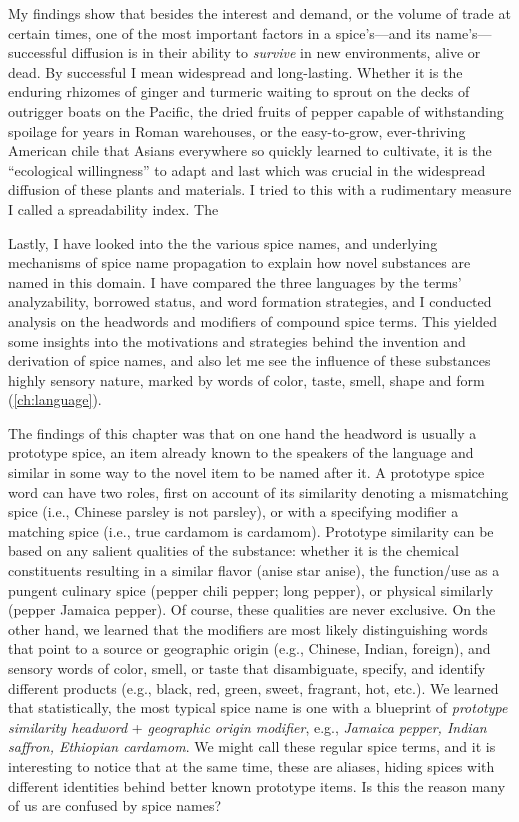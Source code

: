 My findings show that besides the interest and demand, or the volume of trade at certain times, one of the most important factors in a spice's---and its name's---successful diffusion is in their ability to \textit{survive} in new environments, alive or dead. By successful I mean widespread and long-lasting. Whether it is the enduring rhizomes of ginger and turmeric waiting to sprout on the decks of outrigger boats on the Pacific, the dried fruits of pepper capable of withstanding spoilage for years in Roman warehouses, or the easy-to-grow, ever-thriving American chile that Asians everywhere so quickly learned to cultivate, it is the ``ecological willingness'' to adapt and last which was crucial in the widespread diffusion of these plants and materials. I tried to this with a rudimentary measure I called a spreadability index. The 


Lastly, I have looked into the the various spice names, and underlying mechanisms of spice name propagation to explain how novel substances are named in this domain. I have compared the three languages by the terms' analyzability, borrowed status, and word formation strategies, and I conducted analysis on the headwords and modifiers of compound spice terms. This yielded some insights into the motivations and strategies behind the invention and derivation of spice names, and also let me see the influence of these substances highly sensory nature, marked by words of color, taste, smell, shape and form (\cref{ch:language}). 

The findings of this chapter was that on one hand the headword is usually a prototype spice, an item already known to the speakers of the language and similar in some way to the novel item to be named after it. A prototype spice word can have two roles, first on account of its similarity denoting a mismatching spice (i.e., Chinese parsley is not parsley), or with a specifying modifier a matching spice (i.e., true cardamom is cardamom). Prototype similarity can be based on any salient qualities of the substance: whether it is the chemical constituents resulting in a similar flavor (anise \rightarrow star anise), the function/use as a pungent culinary spice (pepper \rightarrow chili pepper; long pepper), or physical similarly (pepper \rightarrow Jamaica pepper). Of course, these qualities are never exclusive. On the other hand, we learned that the modifiers are most likely distinguishing words that point to a source or geographic origin (e.g., Chinese, Indian, foreign), and sensory words of color, smell, or taste that disambiguate, specify, and identify different products (e.g., black, red, green, sweet, fragrant, hot, etc.). We learned that statistically, the most typical spice name is one with a blueprint of \textit{prototype similarity headword} + \textit{geographic origin modifier}, e.g., \textit{Jamaica pepper, Indian saffron, Ethiopian cardamom}. We might call these regular spice terms, and it is interesting to notice that at the same time, these are aliases, hiding spices with different identities behind better known prototype items. Is this the reason many of us are confused by spice names? 


